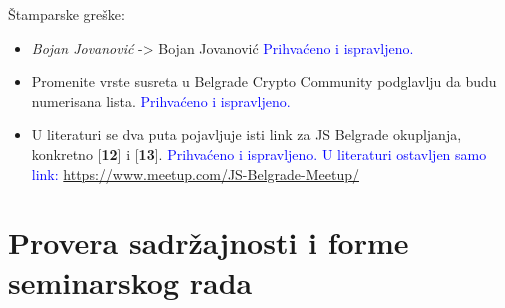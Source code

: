 \documentclass[a4paper]{report}
\newcommand{\odgovor}[1]{\textcolor{blue}{#1}}
\begin{document}
Štamparske greške:\begin{itemize}
\item \textit{Bojan Jovanović} -> Bojan Jovanović
\odgovor{Prihvaćeno i ispravljeno.}
\item Promenite vrste susreta u Belgrade Crypto Community podglavlju da budu numerisana lista.
\odgovor{Prihvaćeno i ispravljeno.}
\item U literaturi se dva puta pojavljuje isti link za JS Belgrade okupljanja, konkretno
      [\textbf{12}] i [\textbf{13}].
\odgovor{Prihvaćeno i ispravljeno. U literaturi ostavljen samo link: \url{https://www.meetup.com/JS-Belgrade-Meetup/}}
\end{itemize}



\section{Provera sadržajnosti i forme seminarskog rada}
\end{document}
